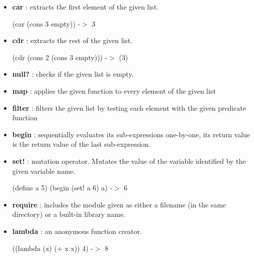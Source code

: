 \documentclass[11pt]{report}
\begin{document}
\begin{appendices}
\begin{itemize}
 \item \textbf{car} : extracts the first element of the given list.

(car (cons 3 empty)) -$>$ 3

 \item \textbf{cdr} : extracts the rest of the given list.

(cdr (cons 2 (cons 3 empty))) -$>$ (3)

 \item \textbf{null?} : checks if the given list is empty.

 \item \textbf{map} : applies the given function to every element of the given list
 \item \textbf{filter} : filters the given list by testing each element with the given predicate function
 \item \textbf{begin} : sequentially evaluates its sub-expressions one-by-one, its return value is the return value of the last sub-expression.
 \item \textbf{set!} : mutation operator. Mutates the value of the variable identified by the given variable name.

(define a 5)
(begin (set! a 6) a) -$>$ 6

 \item \textbf{require} : includes the module given as either a filename (in the same directory) or a built-in library name.
 \item \textbf{lambda} : an anonymous function creator.

((lambda (x) (+ x x)) 4) -$>$ 8
 
\end{itemize}


\end{appendices}
\end{document}
